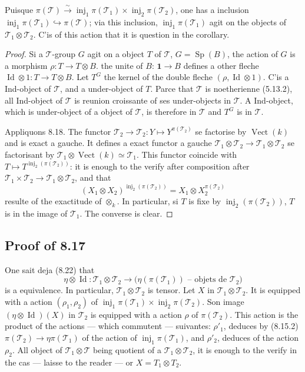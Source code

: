 \documentclass[12pt,a4paper]{article}
\theoremstyle{plain}
\theoremstyle{definition}
\DeclareMathOperator{\Sp}{Sp}
\DeclareMathOperator{\Id}{Id}
\DeclareMathOperator{\Vect}{Vect}
\DeclareMathOperator{\inj}{inj}
\begin{document}
Puisque $\pi(\mathcal{T}) \xrightarrow{\sim} \inj_1 \pi(\mathcal{T}_1) \times \inj_2 \pi(\mathcal{T}_2)$, one has a inclusion $\inj_1 \pi(\mathcal{T}_1) \hookrightarrow \pi(\mathcal{T})$; via this inclusion, $\inj_1 \pi(\mathcal{T}_1)$ agit on the objects of $\mathcal{T}_1 \otimes \mathcal{T}_2$. C'is of this action that it is question in the corollary.

\begin{proof}
Si a $\mathcal{T}$-group $G$ agit on a object $T$ of $\mathcal{T}$, $G = \Sp(B)$, the action of $G$ is a morphism $\rho : T \to T \otimes B$. the unite of $B$: $\mathbf{1} \to B$ defines a other fleche $\Id \otimes 1 : T \to T \otimes B$. Let $T^G$ the kernel of the double fleche $(\rho, \Id \otimes 1)$. C'is a Ind-object of $\mathcal{T}$, and a under-object of $T$. Parce that $\mathcal{T}$ is noetherienne (5.13.2), all Ind-object of $\mathcal{T}$ is reunion croissante of ses under-objects in $\mathcal{T}$. A Ind-object, which is under-object of a object of $\mathcal{T}$, is therefore in $\mathcal{T}$ and $T^G$ is in $\mathcal{T}$.

Appliquons 8.18. The functor $\mathcal{T}_2 \to \mathcal{T}_2 : Y \mapsto Y^{\pi(\mathcal{T}_2)}$ se factorise by $\Vect(k)$ and is exact a gauche. It defines a exact functor a gauche $\mathcal{T}_1 \otimes \mathcal{T}_2 \to \mathcal{T}_1 \otimes \mathcal{T}_2$ se factorisant by $\mathcal{T}_1 \otimes \Vect(k) \simeq \mathcal{T}_1$. This functor coincide with $T \mapsto T^{\inj_2(\pi(\mathcal{T}_2))}$: it is enough to the verify after composition after $\mathcal{T}_1 \times \mathcal{T}_2 \to \mathcal{T}_1 \otimes \mathcal{T}_2$, and that
\[
(X_1 \otimes X_2)^{\inj_2(\pi(\mathcal{T}_2))} = X_1 \otimes X_2^{\pi(\mathcal{T}_2)}
\]
resulte of the exactitude of $\otimes_k$. In particular, si $T$ is fixe by $\inj_2(\pi(\mathcal{T}_2))$, $T$ is in the image of $\mathcal{T}_1$. The converse is clear.
\end{proof}

\subsection{Proof of 8.17}

One sait deja (8.22) that
\[
\eta \otimes \Id : \mathcal{T}_1 \otimes \mathcal{T}_2 \to \text{($\eta(\pi(\mathcal{T}_1))$ -- objets de $\mathcal{T}_2$)}
\]
is a equivalence. In particular, $\mathcal{T}_1 \otimes \mathcal{T}_2$ is tensor. Let $X$ in $\mathcal{T}_1 \otimes \mathcal{T}_2$. It is equipped with a action $(\rho_1, \rho_2)$ of $\inj_1 \pi(\mathcal{T}_1) \times \inj_2 \pi(\mathcal{T}_2)$. Son image $(\eta \otimes \Id)(X)$ in $\mathcal{T}_2$ is equipped with a action $\rho$ of $\pi(\mathcal{T}_2)$. This action is the product of the actions --- which commutent --- suivantes: $\rho'_1$, deduces by (8.15.2) $\pi(\mathcal{T}_2) \to \eta \pi(\mathcal{T}_1)$ of the action of $\inj_1 \pi(\mathcal{T}_1)$, and $\rho'_2$, deduces of the action $\rho_2$. All object of $\mathcal{T}_1 \otimes \mathcal{T}$ being quotient of a $\mathcal{T}_1 \otimes \mathcal{T}_2$, it is enough to the verify in the cas --- laisse to the reader --- or $X = T_1 \otimes T_2$.
\end{document}
